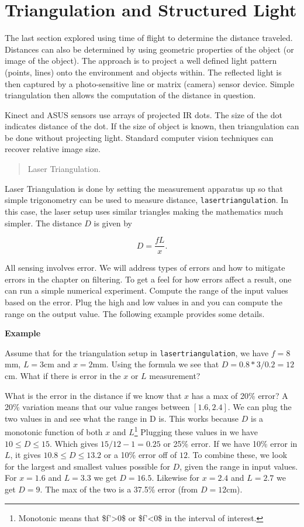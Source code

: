 \hypertarget{triangulation-and-structured-light}{%
\section{Triangulation and Structured
Light}\label{triangulation-and-structured-light}}

The last section explored using time of flight to determine the distance
traveled. Distances can also be determined by using geometric properties
of the object (or image of the object). The approach is to project a
well defined light pattern (points, lines) onto the environment and
objects within. The reflected light is then captured by a
photo-sensitive line or matrix (camera) sensor device. Simple
triangulation then allows the computation of the distance in question.

Kinect and ASUS sensors use arrays of projected IR dots. The size of the
dot indicates distance of the dot. If the size of object is known, then
triangulation can be done without projecting light. Standard computer
vision techniques can recover relative image size.

\begin{quote}
Laser Triangulation.
\end{quote}

Laser Triangulation is done by setting the measurement apparatus up so
that simple trigonometry can be used to measure distance,
\texttt{lasertriangulation}. In this case, the laser setup uses similar
triangles making the mathematics much simpler. The distance \(D\) is
given by

\[D = \displaystyle\frac{fL}{x}.\]

All sensing involves error. We will address types of errors and how to
mitigate errors in the chapter on filtering. To get a feel for how
errors affect a result, one can run a simple numerical experiment.
Compute the range of the input values based on the error. Plug the high
and low values in and you can compute the range on the output value. The
following example provides some details.

\textbf{Example}

Assume that for the triangulation setup in \texttt{lasertriangulation},
we have \(f=8\)mm, \(L = 3\)cm and \(x = 2\)mm. Using the formula we see
that \(D = 0.8*3/0.2 =12\)cm. What if there is error in the \(x\) or
\(L\) measurement?

What is the error in the distance if we know that \(x\) has a max of
20\% error? A 20\% variation means that our value ranges between
\([1.6, 2.4]\). We can plug the two values in and see what the range in
D is. This works because \(D\) is a monotonic function of both \(x\) and
\(L\)\footnote{Monotonic means that \$f'\textgreater0\$ or
  \$f'\textless0\$ in the interval of interest.} Plugging these values
in we have \(10 \leq D \leq 15\). Which gives \(15/12 - 1 = 0.25\) or
25\% error. If we have 10\% error in \(L\), it gives
\(10.8 \leq D \leq 13.2\) or a 10\% error off of \(12\). To combine
these, we look for the largest and smallest values possible for \(D\),
given the range in input values. For \(x=1.6\) and \(L=3.3\) we get
\(D=16.5\). Likewise for \(x=2.4\) and \(L=2.7\) we get \(D=9\). The max
of the two is a 37.5\% error (from \(D=12\)cm).

